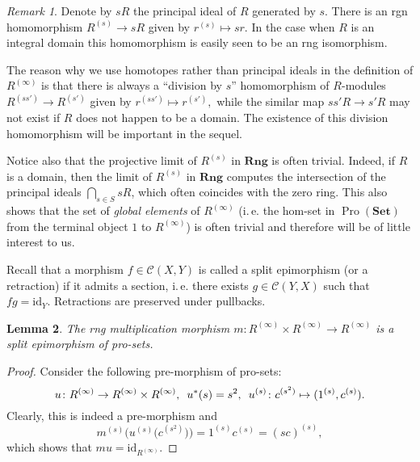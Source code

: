 \documentclass{article}
\numberwithin{equation}{section}
\newtheorem{lemma}{Lemma} \numberwithin{lemma}{section}
\theoremstyle{definition}
\theoremstyle{remark}
\newtheorem{rem}[lemma]{Remark}
\DeclareMathOperator{\Pro}{Pro}
\newcommand{\Set}{\mathbf{Set}}
\newcommand{\Rng}{\mathbf{Rng}}
\begin{document}
\begin{rem}\label{rem:prorings-comment}
 Denote by $sR$ the principal ideal of $R$ generated by $s$. 
 There is an rgn homomorphism $R^{(s)} \to sR$ given by $r^{(s)}\mapsto sr$.
 In the case when $R$ is an integral domain this homomorphism is easily seen to be an rng isomorphism.
 
 The reason why we use homotopes rather than principal ideals in the definition of $R^{(\infty)}$ is that
 there is always a ``division by $s$'' homomorphism of $R$-modules $R^{(ss')} \to R^{(s')}$ given by $r^{(ss')} \mapsto r^{(s')},$
 while the similar map $ss'R \to s'R$ may not exist if $R$ does not happen to be a domain.
 The existence of this division homomorphism will be important in the sequel.
 
 Notice also that the projective limit of $R^{(s)}$ in $\Rng$ is often trivial.
 Indeed, if $R$ is a domain, then the limit of $R^{(s)}$ in $\Rng$ computes the intersection of the principal ideals $\bigcap_{s\in S} sR$, which often coincides with the zero ring. 
 This also shows that the set of {\it global elements} of $R^{(\infty)}$ (i.\,e. the hom-set in $\Pro(\Set)$ from the terminal object $1$ to $R^{(\infty)}$) is often trivial and therefore will be of little interest to us.
\end{rem}

Recall that a morphism \(f \in \mathcal C(X, Y)\) is called a split epimorphism (or a retraction) if it admits a section,
 i.\,e. there exists $g \in \mathcal{C}(Y, X)$ such that $fg = \mathrm{id}_{Y}$. Retractions are preserved under pullbacks.

\begin{lemma}\label{RingGeneration}
The rng multiplication morphism $m \colon R^{(\infty)} \times R^{(\infty)} \to R^{(\infty)}$ is a split epimorphism of pro-sets.
\end{lemma}
\begin{proof}
Consider the following pre-morphism of pro-sets:
\[u \colon R^{(\infty)} \to R^{(\infty)} \times R^{(\infty)}, \enskip u^*(s) = s^2, \enskip u^{(s)} \colon c^{(s^2)} \mapsto (1^{(s)}, c^{(s)}).\]
Clearly, this is indeed a pre-morphism and
\[m^{(s)}\bigl(u^{(s)}\bigl(c^{(s^2)}\bigr)\bigr) = 1^{(s)} c^{(s)} = (sc)^{(s)},\]
which shows that $mu = \mathrm{id}_{R^{(\infty)}}$.
\end{proof}
\end{document}
